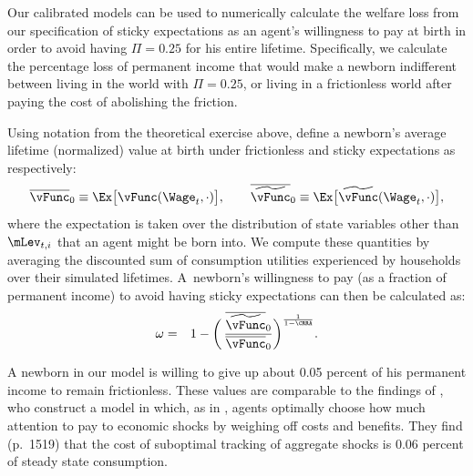 Our calibrated models can be used to numerically calculate the welfare loss from our specification of sticky expectations as an agent's willingness to pay at birth in order to avoid having $\Pi=0.25$ for his entire lifetime. %
Specifically, we calculate the percentage loss of permanent income that would make a newborn indifferent between living in the world with $\Pi=0.25$, or living in a frictionless world after paying the cost of abolishing the friction.  %

Using notation from the theoretical exercise above, define a newborn's average lifetime (normalized) value at birth under frictionless and sticky expectations as respectively:
\begin{equation*}
  \overline{\vFunc}_0 \equiv \Ex \big[ \vFunc(\Wage_t,\cdot)\big], \qquad \overline{\perc{\vFunc}}_0 \equiv \Ex \big[ \perc{\vFunc}(\Wage_t,\cdot)\big],
\end{equation*}
where the expectation is taken over the distribution of state variables other than $\mLev_{t,i}$ that an agent might be born into.  We compute these quantities by averaging the discounted sum of consumption utilities experienced by households over their simulated lifetimes.  A~newborn's willingness to pay (as a fraction of permanent income) to avoid having sticky expectations can then be calculated as:
\begin{eqnarray}\label{eq:WTP}
  \omega & = & 1 - \bigg(\,\frac{\overline{\perc{\vFunc}}_0}{\overline{\vFunc}_0} \bigg)^{\frac{1}{1-\CRRA}}.
\end{eqnarray}

A newborn in our model is willing to give up about 0.05 percent of his permanent income to remain frictionless.  These values are comparable to the findings of \cite{mackWiedREStud15}, who construct a model in which, as in \cite{reis:inattentive}, agents optimally choose how much attention to pay to economic shocks by weighing off costs and benefits.  They find (p.\ 1519) that the cost of suboptimal tracking of aggregate shocks is 0.06 percent of steady state consumption. %


